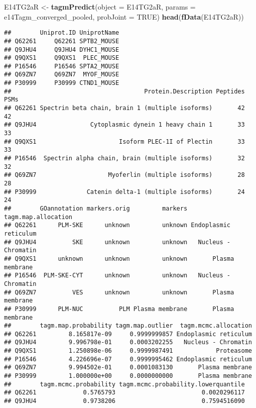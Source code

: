 \documentclass[]{article}
\newenvironment{Shaded}{\begin{snugshade}}{\end{snugshade}}
\newcommand{\KeywordTok}[1]{\textcolor[rgb]{0.13,0.29,0.53}{\textbf{{#1}}}}
\newcommand{\DataTypeTok}[1]{\textcolor[rgb]{0.13,0.29,0.53}{{#1}}}
\newcommand{\StringTok}[1]{\textcolor[rgb]{0.31,0.60,0.02}{{#1}}}
\newcommand{\OtherTok}[1]{\textcolor[rgb]{0.56,0.35,0.01}{{#1}}}
\newcommand{\NormalTok}[1]{{#1}}
\begin{document}
\begin{Shaded}
\begin{Highlighting}[]
\NormalTok{E14TG2aR <-}\StringTok{ }\KeywordTok{tagmPredict}\NormalTok{(}\DataTypeTok{object =} \NormalTok{E14TG2aR,}
                        \DataTypeTok{params =} \NormalTok{e14Tagm_converged_pooled,}
                        \DataTypeTok{probJoint =} \OtherTok{TRUE}\NormalTok{)}
\KeywordTok{head}\NormalTok{(}\KeywordTok{fData}\NormalTok{(E14TG2aR))}
\end{Highlighting}
\end{Shaded}

\begin{verbatim}
##        Uniprot.ID UniprotName
## Q62261     Q62261 SPTB2_MOUSE
## Q9JHU4     Q9JHU4 DYHC1_MOUSE
## Q9QXS1     Q9QXS1  PLEC_MOUSE
## P16546     P16546 SPTA2_MOUSE
## Q69ZN7     Q69ZN7  MYOF_MOUSE
## P30999     P30999 CTND1_MOUSE
##                                     Protein.Description Peptides PSMs
## Q62261 Spectrin beta chain, brain 1 (multiple isoforms)       42   42
## Q9JHU4               Cytoplasmic dynein 1 heavy chain 1       33   33
## Q9QXS1                       Isoform PLEC-1I of Plectin       33   33
## P16546  Spectrin alpha chain, brain (multiple isoforms)       32   32
## Q69ZN7                    Myoferlin (multiple isoforms)       28   28
## P30999              Catenin delta-1 (multiple isoforms)       24   24
##        GOannotation markers.orig         markers   tagm.map.allocation
## Q62261      PLM-SKE      unknown         unknown Endoplasmic reticulum
## Q9JHU4          SKE      unknown         unknown   Nucleus - Chromatin
## Q9QXS1      unknown      unknown         unknown       Plasma membrane
## P16546  PLM-SKE-CYT      unknown         unknown   Nucleus - Chromatin
## Q69ZN7          VES      unknown         unknown       Plasma membrane
## P30999      PLM-NUC          PLM Plasma membrane       Plasma membrane
##        tagm.map.probability tagm.map.outlier  tagm.mcmc.allocation
## Q62261         8.165817e-09     0.9999999857 Endoplasmic reticulum
## Q9JHU4         9.996798e-01     0.0003202255   Nucleus - Chromatin
## Q9QXS1         1.250898e-06     0.9999987491            Proteasome
## P16546         4.226696e-07     0.9999995462 Endoplasmic reticulum
## Q69ZN7         9.994502e-01     0.0001083130       Plasma membrane
## P30999         1.000000e+00     0.0000000000       Plasma membrane
##        tagm.mcmc.probability tagm.mcmc.probability.lowerquantile
## Q62261             0.5765793                        0.0020296117
## Q9JHU4             0.9738206                        0.7594516090

\end{verbatim}
\end{document}
